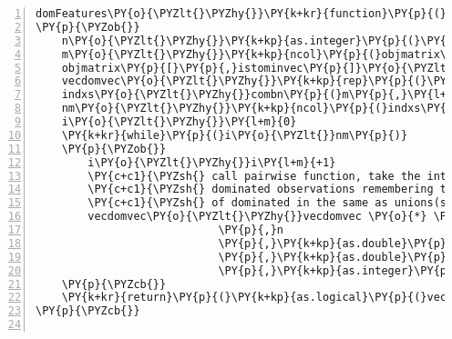 \begin{Verbatim}[commandchars=\\\{\},codes={\catcode`\$=3\catcode`\^=7\catcode`\_=8},gobble=0,numbers=left,fontfamily=fvm,fontshape=n,fontsize=\footnotesize,tabsize=2]
domFeatures\PY{o}{\PYZlt{}\PYZhy{}}\PY{k+kr}{function}\PY{p}{(}objmatrix\PY{p}{,}istominvec\PY{p}{)}
\PY{p}{\PYZob{}}
	n\PY{o}{\PYZlt{}\PYZhy{}}\PY{k+kp}{as.integer}\PY{p}{(}\PY{k+kp}{nrow}\PY{p}{(}objmatrix\PY{p}{)}\PY{p}{)}
	m\PY{o}{\PYZlt{}\PYZhy{}}\PY{k+kp}{ncol}\PY{p}{(}objmatrix\PY{p}{)}
	objmatrix\PY{p}{[}\PY{p}{,}istominvec\PY{p}{]}\PY{o}{\PYZlt{}\PYZhy{}} \PY{o}{\PYZhy{}}objmatrix\PY{p}{[}\PY{p}{,}istominvec\PY{p}{]}
	vecdomvec\PY{o}{\PYZlt{}\PYZhy{}}\PY{k+kp}{rep}\PY{p}{(}\PY{l+m}{1}\PY{p}{,}n\PY{p}{)}
	indxs\PY{o}{\PYZlt{}\PYZhy{}}combn\PY{p}{(}m\PY{p}{,}\PY{l+m}{2}\PY{p}{)}
	nm\PY{o}{\PYZlt{}\PYZhy{}}\PY{k+kp}{ncol}\PY{p}{(}indxs\PY{p}{)}
	i\PY{o}{\PYZlt{}\PYZhy{}}\PY{l+m}{0}
	\PY{k+kr}{while}\PY{p}{(}i\PY{o}{\PYZlt{}}nm\PY{p}{)}
	\PY{p}{\PYZob{}}
		i\PY{o}{\PYZlt{}\PYZhy{}}i\PY{l+m}{+1}
		\PY{c+c1}{\PYZsh{} call pairwise function, take the intersection of previous }
		\PY{c+c1}{\PYZsh{} dominated observations remembering the intersection(s)}
		\PY{c+c1}{\PYZsh{} of dominated in the same as unions(s) of Pareto fronts}
		vecdomvec\PY{o}{\PYZlt{}\PYZhy{}}vecdomvec \PY{o}{*} \PY{l+m}{.}C\PY{p}{(}\PY{l+s}{\PYZdq{}}\PY{l+s}{domfeat\PYZdq{}}
							\PY{p}{,}n
							\PY{p}{,}\PY{k+kp}{as.double}\PY{p}{(}objmatrix\PY{p}{[}\PY{p}{,}indxs\PY{p}{[}\PY{l+m}{1}\PY{p}{,}i\PY{p}{]]}\PY{p}{)}
							\PY{p}{,}\PY{k+kp}{as.double}\PY{p}{(}objmatrix\PY{p}{[}\PY{p}{,}indxs\PY{p}{[}\PY{l+m}{2}\PY{p}{,}i\PY{p}{]]}\PY{p}{)}
							\PY{p}{,}\PY{k+kp}{as.integer}\PY{p}{(}\PY{k+kp}{rep}\PY{p}{(}\PY{l+m}{0}\PY{p}{,}n\PY{p}{)}\PY{p}{)}\PY{p}{)}\PY{p}{[[}\PY{l+m}{4}\PY{p}{]]}
	\PY{p}{\PYZcb{}}
	\PY{k+kr}{return}\PY{p}{(}\PY{k+kp}{as.logical}\PY{p}{(}vecdomvec\PY{p}{)}\PY{p}{)}
\PY{p}{\PYZcb{}}


\end{Verbatim}
